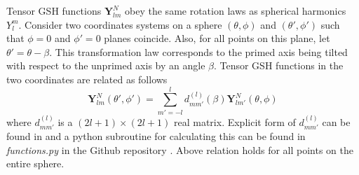 Tensor GSH functions $\mathbf{Y}_{lm}^N$ obey the same rotation laws as spherical harmonics $Y_{l}^{m}$. Consider two coordinates systems on a sphere $(\theta,\phi)$ and $(\theta',\phi')$ such that $\phi=0$ and $\phi'=0$ planes coincide. Also, for all points on this plane, let $\theta' = \theta-\beta$. This transformation law corresponds to the primed axis being tilted with respect to the unprimed axis by an angle $\beta$. Tensor GSH functions in the two coordinates are related as follows
\begin{equation}
\mathbf{Y}_{lm}^{N}(\theta',\phi') = \sum_{m'=-l}^{l} d_{mm'}^{(l)}(\beta) \mathbf{Y}_{lm'}^{N}(\theta,\phi)
\end{equation}
where $d_{mm'}^{(l)}$ is a $(2l+1)\times (2l+1)$ real matrix. Explicit form of $d^{(l)}_{mm'}$ can be found in \cite{DT98} and a python subroutine for calculating this can be  found in \textit{functions.py} in the Github repository \cite{main_repo}. Above relation holds for all points on the entire sphere.

